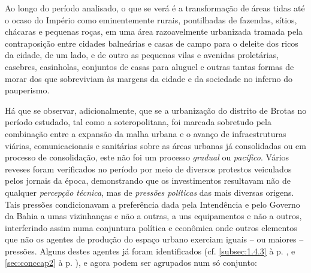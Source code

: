 Ao longo do período analisado, o que se verá é a transformação de áreas tidas até o ocaso do Império como eminentemente rurais, pontilhadas de fazendas, sítios, chácaras e pequenas roças, em uma área razoavelmente urbanizada tramada pela contraposição entre cidades balneárias e casas de campo para o deleite dos ricos da cidade, de um lado, e de outro as pequenas vilas e avenidas proletárias, casebres, casinholas, conjuntos de casas para aluguel e outras tantas formas de morar dos que sobreviviam às margens da cidade e da sociedade no inferno do pauperismo.

Há que se observar, adicionalmente, que se a urbanização do distrito de Brotas no período estudado, tal como a soteropolitana, foi marcada sobretudo pela combinação entre a expansão da malha urbana e o avanço de infraestruturas viárias, comunicacionais e sanitárias sobre as áreas urbanas já consolidadas ou em processo de consolidação, este não foi um processo \textit{gradual} ou \textit{pacífico}. Vários reveses foram verificados no período por meio de diversos protestos veiculados pelos jornais da época, demonstrando que os investimentos resultavam não de qualquer \textit{percepção técnica}, mas de \textit{pressões políticas} das mais diversas origens. Tais pressões condicionavam a preferência dada pela Intendência e pelo Governo da Bahia a umas vizinhanças e não a outras, a uns equipamentos e não a outros, interferindo assim numa conjuntura política e econômica onde outros elementos que não os agentes de produção do espaço urbano exerciam iguais -- ou maiores -- pressões. Alguns destes agentes já foram identificados (cf. \autoref{subsec:1.4.3} à p. \pageref{subsec:1.4.3}, e \autoref{sec:conccap2} à p. \pageref{sec:conccap2}), e agora podem ser agrupados num só conjunto:

